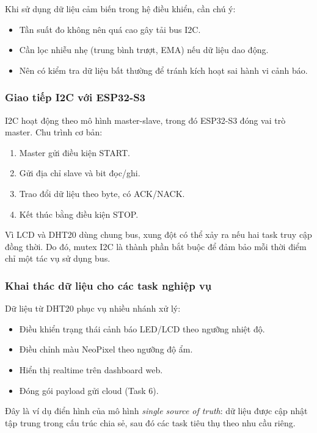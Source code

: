 Khi sử dụng dữ liệu cảm biến trong hệ điều khiển, cần chú ý:
\begin{itemize}
    \item Tần suất đo không nên quá cao gây tải bus I2C.
    \item Cần lọc nhiễu nhẹ (trung bình trượt, EMA) nếu dữ liệu dao động.
    \item Nên có kiểm tra dữ liệu bất thường để tránh kích hoạt sai hành vi cảnh báo.
\end{itemize}

\subsubsection*{Giao tiếp I2C với ESP32-S3}

I2C hoạt động theo mô hình master-slave, trong đó ESP32-S3 đóng vai trò master. Chu trình cơ bản:
\begin{enumerate}
    \item Master gửi điều kiện START.
    \item Gửi địa chỉ slave và bit đọc/ghi.
    \item Trao đổi dữ liệu theo byte, có ACK/NACK.
    \item Kết thúc bằng điều kiện STOP.
\end{enumerate}

Vì LCD và DHT20 dùng chung bus, xung đột có thể xảy ra nếu hai task truy cập đồng thời. Do đó, mutex I2C là thành phần bắt buộc để đảm bảo mỗi thời điểm chỉ một tác vụ sử dụng bus.

\subsubsection*{Khai thác dữ liệu cho các task nghiệp vụ}

Dữ liệu từ DHT20 phục vụ nhiều nhánh xử lý:
\begin{itemize}
    \item Điều khiển trạng thái cảnh báo LED/LCD theo ngưỡng nhiệt độ.
    \item Điều chỉnh màu NeoPixel theo ngưỡng độ ẩm.
    \item Hiển thị realtime trên dashboard web.
    \item Đóng gói payload gửi cloud (Task 6).
\end{itemize}

Đây là ví dụ điển hình của mô hình \textit{single source of truth}: dữ liệu được cập nhật tập trung trong cấu trúc chia sẻ, sau đó các task tiêu thụ theo nhu cầu riêng.


